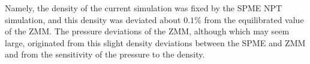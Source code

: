 \documentclass[a4paper,preprint,unsortedaddress,onecolumn,fleqn]{revtex4}
\newcommand{\eps}{\varepsilon}
\newcommand{\systemmb}{M_1}
\newcommand{\systemlb}{L_1}
\begin{document}
{Namely, the density of
the current simulation was fixed by the SPME NPT simulation, and this
density was deviated about $0.1$\% from the equilibrated value of the ZMM.} {%
The pressure deviations of the ZMM, although which may seem
large, originated from this slight density deviations between the SPME and
ZMM and from the sensitivity of the pressure to the density.} 
\end{document}

